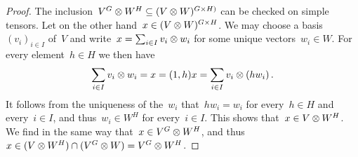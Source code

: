 \documentclass[a4paper,11pt]{scrartcl}
\begin{document}
\begin{proof}
  The inclusion~$V^G \otimes W^H \subseteq (V \otimes W)^{G \times H)}$ can be checked on simple tensors.
  Let on the other hand~$x \in (V \otimes W)^{G \times H}$.
  We may choose a basis~$(v_i)_{i \in I}$ of~$V$ and write~$x = \sum_{i \in I} v_i \otimes w_i$ for some unique vectors~$w_i \in W$.
  For every element~$h \in H$ we then have
  \[
    \sum_{i \in I} v_i \otimes w_i
    =
    x
    =
    (1,h) x
    =
    \sum_{i \in I} v_i \otimes (h w_i) \,.
  \]
  It follows from the uniqueness of the~$w_i$ that~$h w_i = w_i$ for every~$h \in H$ and every~$i \in I$, and thus~$w_i \in W^H$ for every~$i \in I$.
  This shows that~$x \in V \otimes W^H$.
  We find in the same way that~$x \in V^G \otimes W^H$, and thus~$x \in (V \otimes W^H) \cap (V^G \otimes W) = V^G \otimes W^H$.
\end{proof}





\printbibliography
\end{document}
